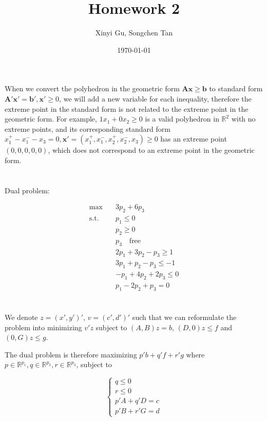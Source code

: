 \documentclass{article}
\title{Homework 2}
\author{Xinyi Gu, Songchen Tan}
\date{\today}
\newcommand{\A}{\bm A}
\newcommand{\x}{\bm x}
\renewcommand{\b}{\bm b}
\newcommand{\1}{\bm 1}
\begin{document}
\maketitle
\section{}
When we convert the polyhedron in the geometric form $\A\x\ge\b$ to standard form $\A'\x'=\b',\x'\ge0$, we will add a new variable for each inequality, therefore the extreme point in the standard form is not related to the extreme point in the geometric form. For example, $1x_1+0x_2\ge0$ is a valid polyhedron in $\mathbb R^2$ with no extreme points, and its corresponding standard form $x_1^+-x_1^--x_3=0, \x'=(x_1^+,x_1^-,x_2^+,x_2^-,x_3)\ge0$ has an extreme point $(0, 0, 0, 0, 0)$, which does not correspond to an extreme point in the geometric form.

\section{}

Dual problem:

\begin{align*}
    \max \quad & 3p_2 + 6 p_3  \\
    \text{s.t.} \quad & p_1 \leq 0 \\
    & p_2 \geq 0\\
    & p_3 \quad \text{free}\\
    & 2p_1 + 3p_2 - p_3 \geq 1 \\
    & 3p_1 + p_2 - p_3 \leq -1 \\
    & -p_1 + 4p_2 + 2p_3 \leq 0 \\
    & p_1 - 2p_2 + p_3 = 0
\end{align*}



\section{}
We denote $z=(x',y')'$, $v=(c',d')'$ such that we can reformulate the problem into minimizing $v'z$ subject to $(A, B)z=b$, $(D, 0)z\le f$ and $(0, G)z\le g$.

The dual problem is therefore maximizing $p'b+q'f+r'g$ where $p\in\mathbb R^{p_1}, q\in\mathbb R^{p_2}, r\in\mathbb R^{p_3}$, subject to

$$
\begin{cases}
    q\le 0\\
    r\le 0\\
    p'A+q'D=c\\
    p'B+r'G=d
\end{cases}
$$
\end{document}
